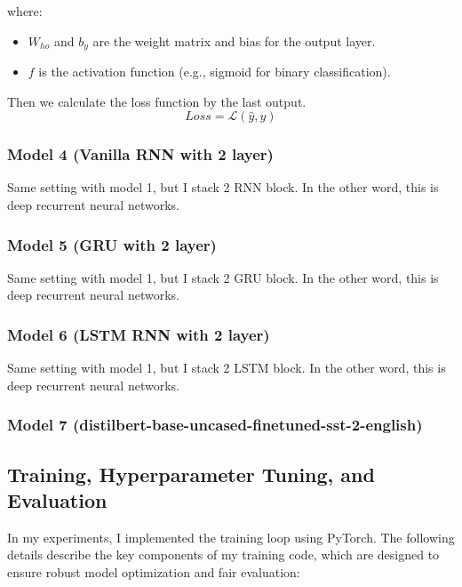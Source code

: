 \documentclass[12pt,a4paper]{article}
\begin{document}
where:
\begin{itemize}
    \item $W_{ho}$ and $b_y$ are the weight matrix and bias for the output layer.
    \item $f$ is the activation function (e.g., sigmoid for binary classification).
\end{itemize}

Then we calculate the loss function by the last output.
\begin{equation}
    Loss = \mathcal{L}(\hat{y}, y)
\end{equation}

\subsubsection{Model 4 (Vanilla RNN with 2 layer)}
Same setting with model 1, but I stack 2 RNN block. In the other word, this is deep recurrent neural networks. 
\subsubsection{Model 5 (GRU with 2 layer)}
Same setting with model 1, but I stack 2 GRU block. In the other word, this is deep recurrent neural networks. 
\subsubsection{Model 6 (LSTM RNN with 2 layer)}
Same setting with model 1, but I stack 2 LSTM block. In the other word, this is deep recurrent neural networks. 

\subsubsection{Model 7 (distilbert-base-uncased-finetuned-sst-2-english)}


\newpage
\subsection{Training, Hyperparameter Tuning, and Evaluation}
In my experiments, I implemented the training loop using PyTorch. The following details describe the key components of my training code, which are designed to ensure robust model optimization and fair evaluation:
    
\end{document}
